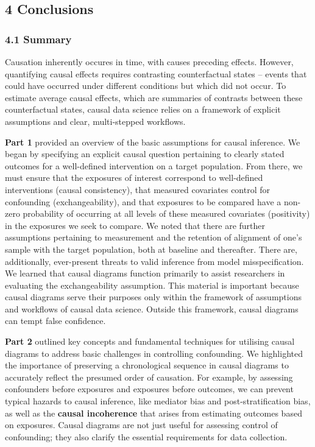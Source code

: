 \documentclass[
  singlecolumn]{article}
\begin{document}
\subsection{4 Conclusions}\label{conclusions}

\subsubsection{4.1 Summary}\label{summary}

Causation inherently occures in time, with causes preceding effects.
However, quantifying causal effects requires contrasting counterfactual
states -- events that could have occurred under different conditions but
which did not occur. To estimate average causal effects, which are
summaries of contrasts between these counterfactual states, causal data
science relies on a framework of explicit assumptions and clear,
multi-stepped workflows.

\textbf{Part 1} provided an overview of the basic assumptions for causal
inference. We began by specifying an explicit causal question pertaining
to clearly stated outcomes for a well-defined intervention on a target
population. From there, we must ensure that the exposures of interest
correspond to well-defined interventions (causal consistency), that
measured covariates control for confounding (exchangeability), and that
exposures to be compared have a non-zero probability of occurring at all
levels of these measured covariates (positivity) in the exposures we
seek to compare. We noted that there are further assumptions pertaining
to measurement and the retention of alignment of one's sample with the
target population, both at baseline and thereafter. There are,
additionally, ever-present threats to valid inference from model
misspecification. We learned that causal diagrams function primarily to
assist researchers in evaluating the exchangeability assumption. This
material is important because causal diagrams serve their purposes only
within the framework of assumptions and workflows of causal data
science. Outside this framework, causal diagrams can tempt false
confidence.

\textbf{Part 2} outlined key concepts and fundamental techniques for
utilising causal diagrams to address basic challenges in controlling
confounding. We highlighted the importance of preserving a chronological
sequence in causal diagrams to accurately reflect the presumed order of
causation. For example, by assessing confounders before exposures and
exposures before outcomes, we can prevent typical hazards to causal
inference, like mediator bias and post-stratification bias, as well as
the \textbf{causal incoherence} that arises from estimating outcomes
based on exposures. Causal diagrams are not just useful for assessing
control of confounding; they also clarify the essential requirements for
data collection.
\end{document}
